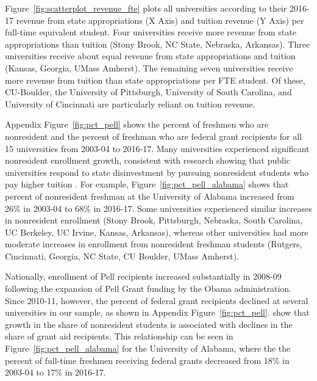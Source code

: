 \documentclass[twoside]{article}
\begin{document}
Figure~\ref{fig:scatterplot_revenue_fte} plots all universities according to their 2016-17 revenue from state appropriations (X Axis) and tuition revenue (Y Axis) per full-time equivalent student. Four universities receive more revenue from state appropriations than tuition (Stony Brook, NC State, Nebraska, Arkansas). Three universities receive about equal revenue from state appropriations and tuition (Kansas, Georgia, UMass Amherst). The remaining seven universities receive more revenue from tuition than state appropriations per FTE student. Of these, CU-Boulder, the University of Pittsburgh, University of South Carolina, and University of Cincinnati are particularly reliant on tuition revenue.



Appendix Figure~\ref{fig:pct_pell} shows the percent of freshmen who are nonresident and the percent of freshman who are federal grant recipients for all 15 universities from 2003-04 to 2016-17. Many universities experienced significant nonresident enrollment growth, consistent with research showing that public universities respond to state disinvestment by pursuing nonresident students who pay higher tuition \citep{RN3753}. For example, Figure~\ref{fig:pct_pell_alabama} shows that percent of nonresident freshman at the University of Alabama increased from 26\% in 2003-04 to 68\% in 2016-17. Some universities experienced similar increases in nonresident enrollment (Stony Brook, Pittsburgh, Nebraska, South Carolina, UC Berkeley, UC Irvine, Kansas, Arkansas), whereas other universities had more moderate increases in enrollment from nonresident freshman students (Rutgers, Cincinnati, Georgia, NC State, CU Boulder, UMass Amherst).

Nationally, enrollment of Pell recipients increased substantially in 2008-09 following the expansion of Pell Grant funding by the Obama administration. Since 2010-11, however, the percent of federal grant recipients declined at several universities in our sample, as shown in Appendix Figure~\ref{fig:pct_pell}. \cite{RN3685} show that growth in the share of nonresident students is associated with declines in the share of grant aid recipients. This relationship can be seen in Figure~\ref{fig:pct_pell_alabama} for the University of Alabama, where the the percent of full-time freshmen receiving federal grants decreased from 18\% in 2003-04 to 17\% in 2016-17.
\end{document}
